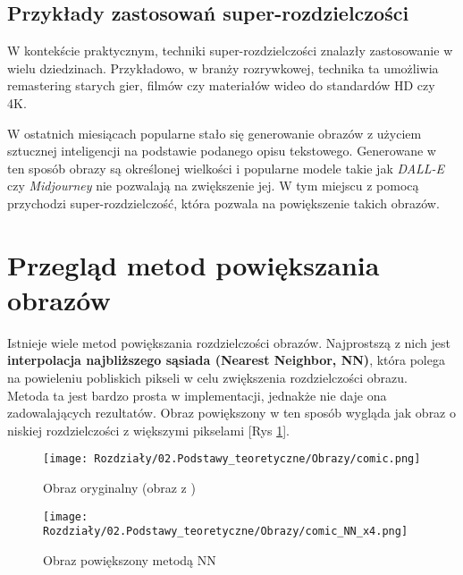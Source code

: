 \subsection*{Przykłady zastosowań super-rozdzielczości}

W kontekście praktycznym, techniki super-rozdzielczości znalazły zastosowanie w wielu dziedzinach. Przykładowo, w branży rozrywkowej, technika ta umożliwia remastering starych gier, filmów czy materiałów wideo do standardów HD czy 4K.

W ostatnich miesiącach popularne stało się generowanie obrazów z użyciem sztucznej inteligencji na podstawie podanego opisu tekstowego. Generowane w ten sposób obrazy są określonej wielkości i popularne modele takie jak \textit{DALL-E} \cite{dalle} czy \textit{Midjourney} \cite{midjourney} nie pozwalają na zwiększenie jej. W tym miejscu z pomocą przychodzi super-rozdzielczość, która pozwala na powiększenie takich obrazów.


\section{Przegląd metod powiększania obrazów} \label{sec:przeglad_metod_powiekszania_obrazow}


Istnieje wiele metod powiększania rozdzielczości obrazów. Najprostszą z nich jest \textbf{interpolacja najbliższego sąsiada (Nearest Neighbor, NN)}, która polega na powieleniu pobliskich pikseli w celu zwiększenia rozdzielczości obrazu. \\
Metoda ta jest bardzo prosta w implementacji, jednakże nie daje ona zadowalających rezultatów. Obraz powiększony w ten sposób wygląda jak obraz o niskiej rozdzielczości z większymi pikselami [Rys \ref{fig:image5}]. 

\begin{figure}[ht]
    \centering
    \begin{minipage}[t]{0.25\linewidth}
        \texttt{[image: Rozdziały/02.Podstawy\_teoretyczne/Obrazy/comic.png]}
        \caption{Obraz oryginalny (obraz z \cite{zeyde2010single})}
        \label{fig:image4}
    \end{minipage}
    \hspace{0.5cm}
    \begin{minipage}[t]{0.25\linewidth}
        \texttt{[image: Rozdziały/02.Podstawy\_teoretyczne/Obrazy/comic\_NN\_x4.png]}
        \caption{Obraz powiększony metodą NN}
        \label{fig:image5}
    \end{minipage}
  \end{figure}


